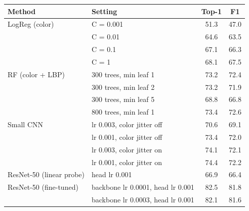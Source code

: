 \begin{tabular}{llcc}
\toprule
Method & Setting & Top-1 & F1 \\
\midrule
LogReg (color) & C = 0.001 & 51.3 & 47.0 \\
 & C = 0.01 & 64.6 & 63.5 \\
 & C = 0.1 & 67.1 & 66.3 \\
 & C = 1 & 68.1 & 67.5 \\
RF (color + LBP) & 300 trees, min leaf 1 & 73.2 & 72.4 \\
 & 300 trees, min leaf 2 & 73.2 & 71.9 \\
 & 300 trees, min leaf 5 & 68.8 & 66.8 \\
 & 800 trees, min leaf 1 & 73.4 & 72.6 \\
Small CNN & lr 0.003, color jitter off & 70.6 & 69.1 \\
 & lr 0.001, color jitter off & 73.4 & 72.0 \\
 & lr 0.003, color jitter on & 74.1 & 72.1 \\
 & lr 0.001, color jitter on & 74.4 & 72.2 \\
ResNet-50 (linear probe) & head lr 0.001 & 66.9 & 66.4 \\
ResNet-50 (fine-tuned) & backbone lr 0.0001, head lr 0.001 & 82.5 & 81.8 \\
 & backbone lr 0.0003, head lr 0.001 & 82.1 & 81.6 \\
\bottomrule
\end{tabular}
